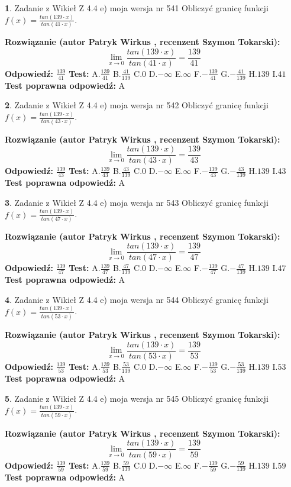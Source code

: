 \documentclass[12pt, a4paper]{article}
\theoremstyle{definition} %
\newtheorem{zad}{}
\newcommand{\zadStart}[1]{\begin{zad}#1\newline}
\newcommand{\zadStop}{\end{zad}}
\newcommand{\rozwStart}[2]{\noindent \textbf{Rozwiązanie (autor #1 , recenzent #2): }\newline}
\newcommand{\rozwStop}{\newline}
\newcommand{\odpStart}{\noindent \textbf{Odpowiedź:}\newline}
\newcommand{\odpStop}{\newline}
\newcommand{\testStart}{\noindent \textbf{Test:}\newline}
\newcommand{\testStop}{\newline}
\newcommand{\kluczStart}{\noindent \textbf{Test poprawna odpowiedź:}\newline}
\newcommand{\kluczStop}{\newline}
\begin{document}
\zadStart{Zadanie z Wikieł Z 4.4 e) moja wersja nr 541}
Obliczyć granicę funkcji $f(x)=\frac{tan(139\cdot x)}{tan(41\cdot x)}$.
\zadStop
\rozwStart{Patryk Wirkus}{Szymon Tokarski}
$$\lim\limits_{x\to 0}\frac{tan(139\cdot x)}{tan(41\cdot x)}=
\frac{139}{41}$$
\rozwStop
\odpStart
$\frac{139}{41}$
\odpStop
\testStart
A.$\frac{139}{41}$
B.$\frac{41}{139}$
C.$0$
D.$-\infty$
E.$\infty$
F.$-\frac{139}{41}$
G.$-\frac{41}{139}$
H.$139$
I.$41$
\testStop
\kluczStart
A
\kluczStop



\zadStart{Zadanie z Wikieł Z 4.4 e) moja wersja nr 542}
Obliczyć granicę funkcji $f(x)=\frac{tan(139\cdot x)}{tan(43\cdot x)}$.
\zadStop
\rozwStart{Patryk Wirkus}{Szymon Tokarski}
$$\lim\limits_{x\to 0}\frac{tan(139\cdot x)}{tan(43\cdot x)}=
\frac{139}{43}$$
\rozwStop
\odpStart
$\frac{139}{43}$
\odpStop
\testStart
A.$\frac{139}{43}$
B.$\frac{43}{139}$
C.$0$
D.$-\infty$
E.$\infty$
F.$-\frac{139}{43}$
G.$-\frac{43}{139}$
H.$139$
I.$43$
\testStop
\kluczStart
A
\kluczStop



\zadStart{Zadanie z Wikieł Z 4.4 e) moja wersja nr 543}
Obliczyć granicę funkcji $f(x)=\frac{tan(139\cdot x)}{tan(47\cdot x)}$.
\zadStop
\rozwStart{Patryk Wirkus}{Szymon Tokarski}
$$\lim\limits_{x\to 0}\frac{tan(139\cdot x)}{tan(47\cdot x)}=
\frac{139}{47}$$
\rozwStop
\odpStart
$\frac{139}{47}$
\odpStop
\testStart
A.$\frac{139}{47}$
B.$\frac{47}{139}$
C.$0$
D.$-\infty$
E.$\infty$
F.$-\frac{139}{47}$
G.$-\frac{47}{139}$
H.$139$
I.$47$
\testStop
\kluczStart
A
\kluczStop



\zadStart{Zadanie z Wikieł Z 4.4 e) moja wersja nr 544}
Obliczyć granicę funkcji $f(x)=\frac{tan(139\cdot x)}{tan(53\cdot x)}$.
\zadStop
\rozwStart{Patryk Wirkus}{Szymon Tokarski}
$$\lim\limits_{x\to 0}\frac{tan(139\cdot x)}{tan(53\cdot x)}=
\frac{139}{53}$$
\rozwStop
\odpStart
$\frac{139}{53}$
\odpStop
\testStart
A.$\frac{139}{53}$
B.$\frac{53}{139}$
C.$0$
D.$-\infty$
E.$\infty$
F.$-\frac{139}{53}$
G.$-\frac{53}{139}$
H.$139$
I.$53$
\testStop
\kluczStart
A
\kluczStop



\zadStart{Zadanie z Wikieł Z 4.4 e) moja wersja nr 545}
Obliczyć granicę funkcji $f(x)=\frac{tan(139\cdot x)}{tan(59\cdot x)}$.
\zadStop
\rozwStart{Patryk Wirkus}{Szymon Tokarski}
$$\lim\limits_{x\to 0}\frac{tan(139\cdot x)}{tan(59\cdot x)}=
\frac{139}{59}$$
\rozwStop
\odpStart
$\frac{139}{59}$
\odpStop
\testStart
A.$\frac{139}{59}$
B.$\frac{59}{139}$
C.$0$
D.$-\infty$
E.$\infty$
F.$-\frac{139}{59}$
G.$-\frac{59}{139}$
H.$139$
I.$59$
\testStop
\kluczStart
A
\kluczStop
\end{document}
